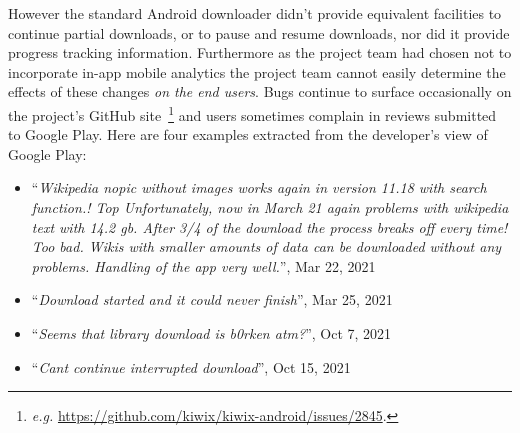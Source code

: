 However the standard Android downloader didn't provide equivalent facilities to continue partial downloads, or to pause and resume downloads, nor did it provide progress tracking information. Furthermore as the project team had chosen not to incorporate in-app mobile analytics the project team cannot easily determine the effects of these changes \emph{on the end users}. Bugs continue to surface occasionally on the project's GitHub site~\footnote{\textit{e.g.} \url{https://github.com/kiwix/kiwix-android/issues/2845}.} and users sometimes complain in reviews submitted to Google Play. Here are four examples extracted from the developer's view of Google Play:

\begin{itemize}
    \itemsep0em
    \item ``\textit{Wikipedia nopic without images works again in version 11.18 with search function.! Top Unfortunately, now in March 21 again problems with wikipedia text with 14.2 gb. After 3/4 of the download the process breaks off every time! Too bad. Wikis with smaller amounts of data can be downloaded without any problems. Handling of the app very well.}'', Mar 22, 2021 %
    \item ``\textit{Download started and it could never finish}'', Mar 25, 2021 %
    \item ``\textit{Seems that library download is b0rken atm?}'', Oct 7, 2021 %
    \item ``\textit{Cant continue interrupted download}'', Oct 15, 2021 %
\end{itemize}

